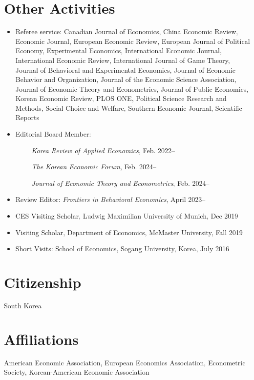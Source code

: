 \documentclass[margin, a4paper]{res}
\begin{document}
\begin{resume}
\section{Other Activities}
\begin{itemize}[leftmargin=*]
\item Referee service: Canadian Journal of Economics, China Economic Review, Economic Journal, European Economic Review, European Journal of Political Economy, Experimental Economics, International Economic Journal, International Economic Review, International Journal of Game Theory, Journal of Behavioral and Experimental Economics, Journal of Economic Behavior and Organization, Journal of the Economic Science Association, Journal of Economic Theory and Econometrics, Journal of Public Economics, Korean Economic Review, PLOS ONE, Political Science Research and Methods, Social Choice and Welfare, Southern Economic Journal, Scientific Reports
\item Editorial Board Member: 

$\qquad$ \emph{Korea Review of Applied Economics}, Feb. 2022--

$\qquad$ \emph{The Korean Economic Forum}, Feb. 2024--

$\qquad$ \emph{Journal of Economic Theory and Econometrics}, Feb. 2024--

\item Review Editor: \emph{Frontiers in Behavioral Economics}, April 2023--
\item CES Visiting Scholar, Ludwig Maximilian University of Munich, Dec 2019
\item Visiting Scholar, Department of Economics, McMaster University, Fall 2019
\item Short Visits: School of Economics, Sogang University, Korea, July 2016
\end{itemize}

\section{Citizenship} South Korea %

\section{Affiliations} American Economic Association, European Economics Association, Econometric Society, Korean-American Economic Association


\end{resume}
\end{document}
